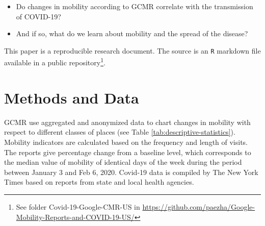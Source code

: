 \documentclass[]{elsarticle} %
\providecommand{\tightlist}{%
  \setlength{\itemsep}{0pt}\setlength{\parskip}{0pt}}
\begin{document}
\begin{itemize}
\tightlist
\item
  Do changes in mobility according to GCMR correlate with the
  transmission of COVID-19?
\item
  And if so, what do we learn about mobility and the spread of the
  disease?
\end{itemize}

This paper is a reproducible research document. The source is an
\texttt{R} markdown file available in a public
repository\footnote{See folder Covid-19-Google-CMR-US in \url{https://github.com/paezha/Google-Mobility-Reports-and-COVID-19-US/}}.

\hypertarget{methods-and-data}{%
\section{Methods and Data}\label{methods-and-data}}

GCMR use aggregated and anonymized data to chart changes in mobility
with respect to different classes of places (see Table
\ref{tab:descriptive-statistics}). Mobility indicators are calculated
based on the frequency and length of visits. The reports give percentage
change from a baseline level, which corresponds to the median value of
mobility of identical days of the week during the period between January
3 and Feb 6, 2020. Covid-19 data is compiled by The New York Times based
on reports from state and local health agencies.
\end{document}
